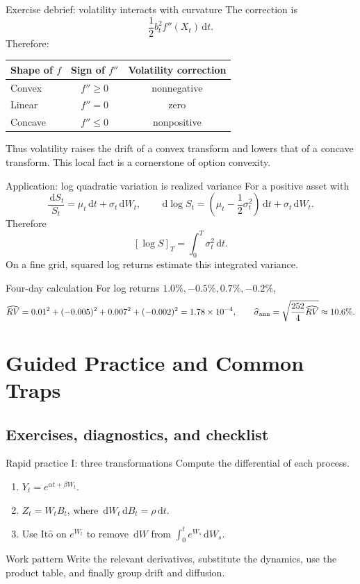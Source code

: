 \documentclass[handout,10pt,aspectratio=169]{beamer}
\newcommand{\dd}{\,\mathrm d}
\newcommand{\Ito}{\mathrm{It\hat{o}}}
\begin{document}
\begin{frame}{Exercise debrief: volatility interacts with curvature}
The correction is
\[
\frac12b_t^2f''(X_t)\dd t.
\]
Therefore:
\begin{center}
\begin{tabular}{lcc}
\toprule
Shape of \(f\) & Sign of \(f''\) & Volatility correction \\
\midrule
Convex & \(f''\ge0\) & nonnegative \\
Linear & \(f''=0\) & zero \\
Concave & \(f''\le0\) & nonpositive \\
\bottomrule
\end{tabular}
\end{center}
Thus volatility raises the drift of a convex transform and lowers that of a concave transform. This local fact is a cornerstone of option convexity.
\end{frame}

\begin{frame}{Application: log quadratic variation is realized variance}
\small
For a positive asset with
\[
\frac{\dd S_t}{S_t}=\mu_t\dd t+\sigma_t\dd W_t,
\qquad
\dd\log S_t
=\left(\mu_t-\frac12\sigma_t^2\right)\dd t+\sigma_t\dd W_t.
\]
Therefore
\[
\boxed{[\log S]_T=\int_0^T\sigma_t^2\dd t.}
\]
On a fine grid, squared log returns estimate this integrated variance.
\begin{block}{Four-day calculation}
For log returns \(1.0\%,-0.5\%,0.7\%,-0.2\%\),
\[
\widehat{RV}=0.01^2+(-0.005)^2+0.007^2+(-0.002)^2
=1.78\times10^{-4},
\qquad
\widehat\sigma_{\rm ann}=\sqrt{\frac{252}{4}\widehat{RV}}\approx10.6\%.
\]
\end{block}
\end{frame}

\section{Guided Practice and Common Traps}
\subsection{Exercises, diagnostics, and checklist}

\begin{frame}{Rapid practice I: three transformations}
Compute the differential of each process.
\begin{enumerate}
\item \(Y_t=e^{\alpha t+\beta W_t}\).
\item \(Z_t=W_tB_t\), where \(\dd W_t\dd B_t=\rho\dd t\).
\item Use \(\Ito\) on \(e^{W_t}\) to remove \(\dd W\) from
\(\int_0^t e^{W_s}\dd W_s\).
\end{enumerate}
\begin{block}{Work pattern}
Write the relevant derivatives, substitute the dynamics, use the product table, and finally group drift and diffusion.
\end{block}
\end{frame}
\end{document}
